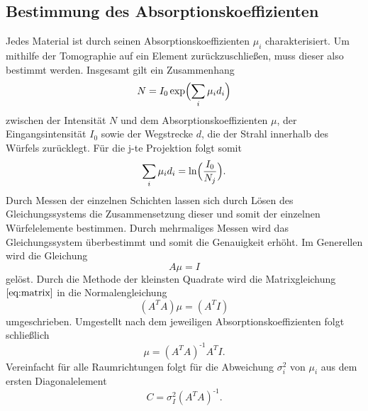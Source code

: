 \subsection{Bestimmung des Absorptionskoeffizienten}
Jedes Material ist durch seinen Absorptionskoeffizienten $\mu_i$ charakterisiert.
Um mithilfe der Tomographie auf ein Element zurückzuschließen, muss dieser also bestimmt werden.
Insgesamt gilt ein Zusammenhang
\begin{equation}
  N=I_0 \exp \Bigl(\sum_{i}\mu_i d_i\Bigr)
\end{equation}
zwischen der Intensität $N$ und dem Absorptionskoeffizienten $\mu$, der Eingangsintensität $I_0$ sowie der Wegstrecke $d$, die der Strahl innerhalb des Würfels zurücklegt.
Für die j-te Projektion folgt somit
\begin{equation}
  \sum_{i}\mu_i d_i =\ln \Bigl(\frac{I_0}{N_j}\Bigr).
\end{equation}
Durch Messen der einzelnen Schichten lassen sich durch Lösen des Gleichungssystems die Zusammensetzung dieser und somit der einzelnen Würfelelemente bestimmen.
Durch mehrmaliges Messen wird das Gleichungssystem überbestimmt und somit die Genauigkeit erhöht.
Im Generellen wird die Gleichung
\begin{equation}
  A \mu = I
  \label{eq:matrix}
\end{equation}
gelöst.
Durch die Methode der kleinsten Quadrate wird die Matrixgleichung $\ref{eq:matrix}$ in die Normalengleichung
\begin{equation}
  (A^TA)\mu = (A^T I)
\end{equation}
umgeschrieben.
Umgestellt nach dem jeweiligen Absorptionskoeffizienten folgt schließlich
\begin{equation}
  \mu = (A^T A)^\text{-1}A^TI.
\end{equation}
Vereinfacht für alle Raumrichtungen folgt für die Abweichung $\sigma_i^2$ von $\mu_i$ aus dem ersten Diagonalelement
\begin{equation}
  C=\sigma_I^2(A^TA)^\text{-1}.
  \label{eq:abweichung}
\end{equation}
\clearpage
